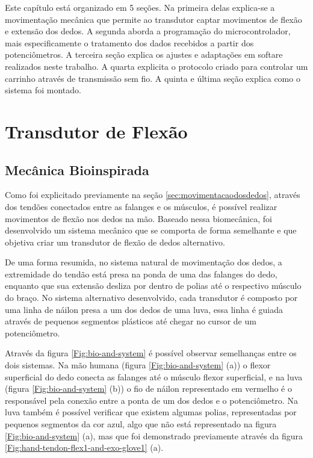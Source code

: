 \documentclass[
	12pt,				%
	openright,			%
	oneside,			%
	a4paper,			%
	english,			%
	brazil				%
	]{abntex2}
\begin{document}
		Este capítulo está organizado em 5 seções. Na primeira delas explica-se a movimentação mecânica que permite ao transdutor captar movimentos de flexão e extensão dos dedos. A segunda aborda a programação do microcontrolador, mais especificamente o tratamento dos dados recebidos a partir dos potenciômetros. A terceira seção explica os ajustes e adaptações em softare realizados neste trabalho. A quarta explicita o protocolo criado para controlar um carrinho através de transmissão sem fio. A quinta e última seção explica como o sistema foi montado.



		\section{Transdutor de Flexão}

			\subsection{Mecânica Bioinspirada}

		Como foi explicitado previamente na seção \ref{sec:movimentacaodosdedos}, através dos tendões conectados entre as falanges e os músculos, é possível realizar movimentos de flexão nos dedos na mão. Baseado nessa biomecânica, foi desenvolvido um sistema mecânico que se comporta de forma semelhante e que objetiva criar um transdutor de flexão de dedos alternativo. 

		De uma forma resumida, no sistema natural de movimentação dos dedos, a extremidade do tendão está presa na ponda de uma das falanges do dedo, enquanto que sua extensão desliza por dentro de polias até o respectivo músculo do braço. No sistema alternativo desenvolvido, cada transdutor é composto por uma linha de náilon presa a um dos dedos de uma luva, essa linha é guiada através de pequenos segmentos plásticos até chegar no cursor de um potenciômetro. 
		
		Através da figura \ref{Fig:bio-and-system} é possível observar semelhanças entre os dois sistemas. Na mão humana (figura \ref{Fig:bio-and-system} (a)) o flexor superficial do dedo conecta as falanges até o músculo flexor superficial, e na luva (figura \ref{Fig:bio-and-system} (b)) o fio de náilon representado em vermelho é o responsável pela conexão entre a ponta de um dos dedos e o potenciômetro. Na luva também é possível verificar que existem algumas polias, representadas por pequenos segmentos da cor azul, algo que não está representado na figura \ref{Fig:bio-and-system} (a), mas que foi demonstrado previamente através da figura \ref{Fig:hand-tendon-flex1-and-exo-glove1} (a).
\end{document}
